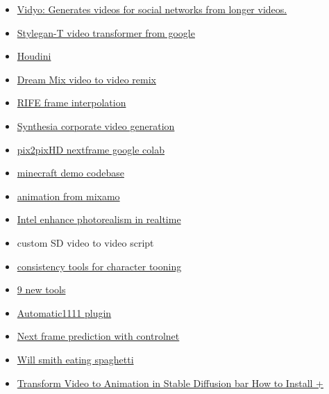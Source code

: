 \begin{itemize}
\item
  \href{https://vidyo.ai/}{Vidyo: Generates videos for social networks
  from longer videos.}
\item
  \href{https://sites.google.com/view/stylegan-t}{Stylegan-T video
  transformer from google}
\item
  \href{https://github.com/proceduralit/StableDiffusion_Houdini}{Houdini}
\item
  \href{https://dreamix-video-editing.github.io/}{Dream Mix video to
  video remix}
\item
  \href{https://github.com/megvii-research/ECCV2022-RIFE}{RIFE frame
  interpolation}
\item
  \href{https://www.youtube.com/watch?v=4uzzD9sD-PI}{Synthesia corporate
  video generation}
\item
  \href{https://colab.research.google.com/github/dvschultz/ml-art-colabs/blob/master/Pix2PixHD_Next_Frame_Prediction.ipynb}{pix2pixHD
  nextframe google colab}
\item
  \href{https://github.com/TSFSean/InvokeAI-DiffusionCraftAI}{minecraft
  demo codebase}
\item
  \href{https://www.reddit.com/r/StableDiffusion/comments/zecyc7/mixamo_animations_stable_diffusion_v2_depth2img/}{animation
  from mixamo}
\item
  \href{https://github.com/isl-org/PhotorealismEnhancement}{Intel
  enhance photorealism in realtime}
\item
  custom SD video to video script
\item
  \href{https://www.reddit.com/r/StableDiffusion/comments/11okvc8/how_about_another_joke_murraaaay/}{consistency
  tools for character tooning}
\item
  \href{https://twitter.com/mreflow/status/1637957302073565184}{9 new
  tools}
\item
  \href{https://www.reddit.com/r/StableDiffusion/comments/11w0ba9/modelscope_17b_text2video_model_is_now_available/}{Automatic1111
  plugin}
\item
  \href{https://www.reddit.com/r/StableDiffusion/comments/11f8i0g/next_frame_prediction_with_controlnet/}{Next
  frame prediction with controlnet}
\item
  \href{https://www.reddit.com/r/StableDiffusion/comments/1244h2c/will_smith_eating_spaghetti/}{Will
  smith eating spaghetti}
\item
  \href{https://www.youtube.com/watch?v=sVmi2Yp43c0\&t=22}{Transform
  Video to Animation in Stable Diffusion bar{} How to Install +
}
\end{itemize}
